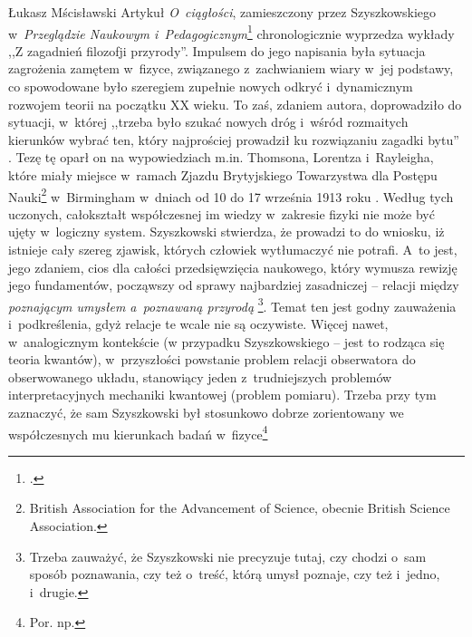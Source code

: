 \begin{artplenv}{Łukasz Mścisławski}
\noindent Artykuł \textit{O~ciągłości}, zamieszczony przez Szyszkowskiego w~\textit{Przeglądzie Naukowym i~Pedagogicznym}\footnote{
\parencite[][]{szyszkowski_o_1916}.%
} chronologicznie wyprzedza wykłady ,,Z zagadnień filozofji przyrody''. Impulsem do jego napisania była sytuacja zagrożenia zamętem w~fizyce, związanego z~zachwianiem wiary w~jej podstawy, co spowodowane było szeregiem zupełnie nowych odkryć i~dynamicznym rozwojem teorii na początku XX wieku. To zaś, zdaniem autora, doprowadziło do sytuacji, w~której ,,trzeba było szukać nowych dróg i~wśród rozmaitych kierunków wybrać ten, który najprościej prowadził ku rozwiązaniu zagadki bytu'' 
\parencite[][s.~44]{szyszkowski_o_1916}. %
 Tezę tę oparł on na wypowiedziach m.in. Thomsona, Lorentza i~Rayleigha, które miały miejsce w~ramach Zjazdu Brytyjskiego Towarzystwa dla Postępu Nauki\footnote{British Association for the Advancement of Science, obecnie British Science Association.} w~Birmingham w~dniach od 10 do 17 września 1913 roku 
\parencite[por.][]{british_association_for_the_advancement_of_science_report_1914}. %
 Według tych uczonych, całokształt współczesnej im wiedzy w~zakresie fizyki nie może być ujęty w~logiczny system. Szyszkowski stwierdza, że prowadzi to do wniosku, iż istnieje cały szereg zjawisk, których człowiek wytłumaczyć nie potrafi. A~to jest, jego zdaniem, cios dla całości przedsięwzięcia naukowego, który wymusza rewizję jego fundamentów, począwszy od sprawy najbardziej zasadniczej -- relacji między \textit{poznającym umysłem a~poznawaną przyrodą} 
\parencite[][s.~44]{szyszkowski_o_1916}%
\footnote{Trzeba zauważyć, że Szyszkowski nie precyzuje tutaj, czy chodzi o~sam sposób poznawania, czy też o~treść, którą umysł poznaje, czy też i~jedno, i~drugie.}. Temat ten jest godny zauważenia i~podkreślenia, gdyż relacje te wcale nie są oczywiste. Więcej nawet, w~analogicznym kontekście (w przypadku Szyszkowskiego -- jest to rodząca się teoria kwantów), w~przyszłości powstanie problem relacji obserwatora do obserwowanego układu, stanowiący jeden z~trudniejszych problemów interpretacyjnych mechaniki kwantowej (problem pomiaru). Trzeba przy tym zaznaczyć, że sam Szyszkowski był stosunkowo dobrze zorientowany we współczesnych mu kierunkach badań w~fizyce\footnote{Por. np. 
}
\end{artplenv}
